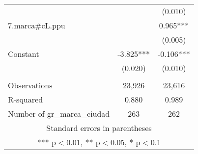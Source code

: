 \begin{tabular}{lcc}
 &  & (0.010) \\
7.marca\#cL.ppu &  & 0.965*** \\
 &  & (0.005) \\
Constant & -3.825*** & -0.106*** \\
 & (0.020) & (0.010) \\
 &  &  \\
Observations & 23,926 & 23,616 \\
R-squared & 0.880 & 0.989 \\
 Number of gr\_marca\_ciudad & 263 & 262 \\ \hline
\multicolumn{3}{c}{ Standard errors in parentheses} \\
\multicolumn{3}{c}{ *** p$<$0.01, ** p$<$0.05, * p$<$0.1} \\
\end{tabular}
